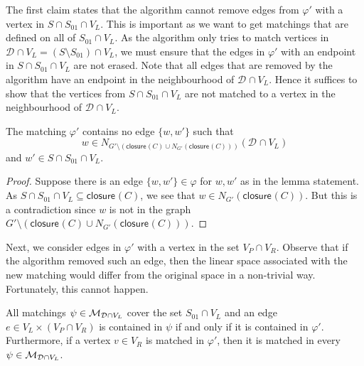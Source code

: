 \documentclass{theoretics}
\newcommand{\set}[1]{\{ #1 \}}
\newcommand{\neigh}[2][]{N_{{#1}}(#2)}
\newcommand{\V}[1][]{V_{#1}}
\newcommand{\Vl}{\V[L]}
\newcommand{\Vr}{\V[R]}
\newcommand{\Vp}{\V[P]}
\newcommand{\Gprime}{G'}
\newcommand{\closure}[2][]{\mathsf{closure}_{{#1}}(#2)}
\newcommand{\diffclosure}[1][]{D_{{#1}}}
\renewcommand{\diffclosure}[1][]{\mathcal{D}_{{#1}}}
\newcommand{\matcha}{\varphi}
\newcommand{\matchb}{\varphi'}
\newcommand{\matchc}{\psi}
\newcommand{\matchings}[1][]{\ensuremath \mathcal{M}_{{#1}}}
\numberwithin{equation}{section}
\begin{document}
The first claim states that the algorithm cannot remove edges from
$\matchb$ with 
a vertex in $S \cap S_{01} \cap \Vl$.
This is important as we want
to get matchings that are defined on all of $S_{01} \cap \Vl$.
As the algorithm only tries to match vertices in 
$\diffclosure \cap \Vl = (S \setminus S_{01}) \cap \Vl$,
we must ensure that the edges in $\matchb$ with an endpoint in
$S \cap S_{01} \cap \Vl$ are not erased.
Note that all edges that are removed by the algorithm have an endpoint in the
neighbourhood of $\diffclosure \cap \Vl$. Hence it suffices to show
that the vertices from $S \cap S_{01} \cap \Vl$ are not matched to
a vertex in the neighbourhood of $\diffclosure \cap \Vl$.

\begin{claim}\label{clm:neighbours}
  The matching $\matchb$ contains no edge $\set{w, w'}$ such that
  $$w \in \neigh[
  {\Gprime \setminus (\closure{C} \cup \neigh[\Gprime]{\closure{C}})}]
  {\diffclosure \cap \Vl}$$
  and
  $w' \in S \cap S_{01} \cap \Vl$.
\end{claim}

\begin{proof}
  Suppose there is an edge $\set{w, w'} \in \matcha$ for $w, w'$ as
  in the lemma statement. As 
  $S \cap S_{01} \cap \Vl\subseteq \closure{C}$, we see that 
  $w \in \neigh[\Gprime]{\closure{C}}$. 
  But this is a contradiction since $w$ is not in the graph
  $\Gprime \setminus (\closure{C} \cup \neigh[\Gprime]{\closure{C}})$. 
\end{proof}

Next, we consider edges in $\matchb$ with a vertex in the set $\Vp \cap \Vr$.
Observe that if the algorithm removed such an edge, then the linear
space associated with the new matching would differ from the original
space in a non-trivial way. Fortunately, this cannot happen. 

\begin{claim}\label{clm:dom_matchings}
  All matchings $\matchc \in \matchings[\diffclosure \cap \Vl]$ 
  cover the set
  $S_{01} \cap \Vl$
  and an edge $e \in \Vl \times (\Vp \cap \Vr)$ is contained in
  $\matchc$ if and only if it is contained in $\matchb$. Furthermore,
  if a vertex $v \in \Vr$ is matched in $\matchb$, then it is matched
  in every $\matchc \in \matchings[\diffclosure \cap \Vl]$.
\end{claim}
\end{document}
